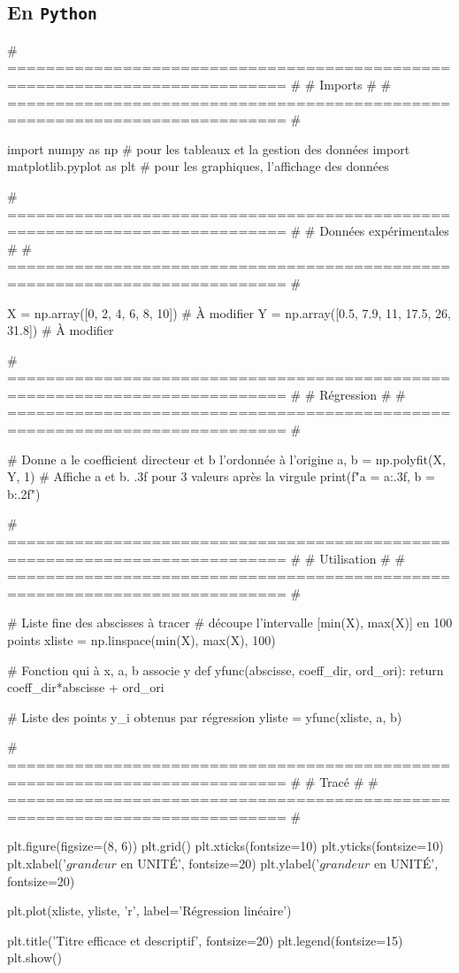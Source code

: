 \documentclass[a4paper, 12pt, garamond]{book}
\begin{document}
\subsection{En \texttt{Python}}
\begin{python}
# =========================================================================== #
#                                   Imports                                   #
# =========================================================================== #

import numpy as np               # pour les tableaux et la gestion des données
import matplotlib.pyplot as plt  # pour les graphiques, l'affichage des données

# =========================================================================== #
#                            Données expérimentales                           #
# =========================================================================== #

X = np.array([0, 2, 4, 6, 8, 10])            # À modifier
Y = np.array([0.5, 7.9, 11, 17.5, 26, 31.8]) # À modifier

# =========================================================================== #
#                                  Régression                                 #
# =========================================================================== #

# Donne a le coefficient directeur et b l'ordonnée à l'origine
a, b = np.polyfit(X, Y, 1)
# Affiche a et b. .3f pour 3 valeurs après la virgule
print(f"a = {a:.3f}, b = {b:.2f}")

# =========================================================================== #
#                                 Utilisation                                 #
# =========================================================================== #

# Liste fine des abscisses à tracer
# découpe l'intervalle [min(X), max(X)] en 100 points
xliste = np.linspace(min(X), max(X), 100)

# Fonction qui à x, a, b associe y
def yfunc(abscisse, coeff_dir, ord_ori):
    return coeff_dir*abscisse + ord_ori

# Liste des points y_i obtenus par régression
yliste = yfunc(xliste, a, b)

# =========================================================================== #
#                                    Tracé                                    #
# =========================================================================== #

plt.figure(figsize=(8, 6))
plt.grid()
plt.xticks(fontsize=10)
plt.yticks(fontsize=10)
plt.xlabel('$grandeur$ en UNITÉ', fontsize=20)
plt.ylabel('$grandeur$ en UNITÉ', fontsize=20)

plt.plot(xliste, yliste,
         'r', label='Régression linéaire')

plt.title('Titre efficace et descriptif', fontsize=20)
plt.legend(fontsize=15)
plt.show()
\end{python}
\end{document}

